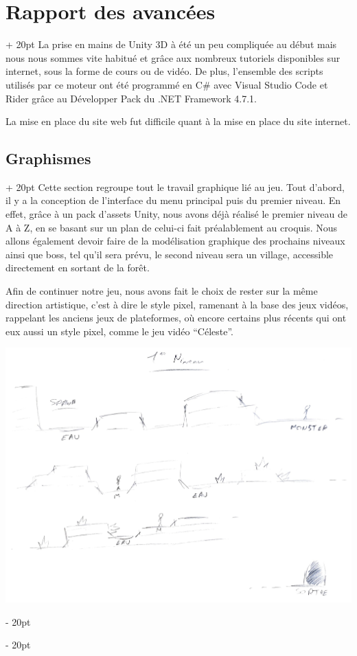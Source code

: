\documentclass[a4paper, 12pt, twoside]{article}
\newcommand{\ind}[1][20pt]{\advance\leftskip + #1}
\newcommand{\deind}[1][20pt]{\advance\leftskip - #1}
\newenvironment{indt}[2][20pt]{#2 \par \ind[#1]}{\par \deind} %
\begin{document}
    \begin{indt}{\section{Rapport des avancées}}
        La prise en mains de Unity 3D à été un peu compliquée au début mais nous nous sommes vite habitué et grâce aux nombreux tutoriels disponibles sur internet, sous la forme de cours ou de vidéo. De plus, l'ensemble des scripts utilisés par ce moteur ont été programmé en C$\#$ avec Visual Studio Code et Rider grâce au Développer Pack du .NET Framework 4.7.1.

        La mise en place du site web fut difficile quant à la mise en place du site internet.

        \begin{indt}{\subsection{Graphismes}}
            Cette section regroupe tout le travail graphique lié au jeu. Tout d'abord, il y a la conception de l'interface du menu principal puis du premier niveau. En effet, grâce à un pack d'assets Unity, nous avons déjà réalisé le premier niveau de A à Z, en se basant sur un plan de celui-ci fait préalablement au croquis. Nous allons également devoir faire de la modélisation graphique des prochains niveaux ainsi que boss, tel qu'il sera prévu, le second niveau sera un village, accessible directement en sortant de la forêt.

            Afin de continuer notre jeu, nous avons fait le choix de rester sur la même direction artistique, c'est à dire le style pixel, ramenant à la base des jeux vidéos, rappelant les anciens jeux de plateformes, où encore certains plus récents qui ont eux aussi un style pixel, comme le jeu vidéo “Céleste”.
            \begin{center}
                \includegraphics[width=0.5\linewidth]{Croquis.jpg}
            \end{center}


\end{indt}
\end{indt}
\end{document}
